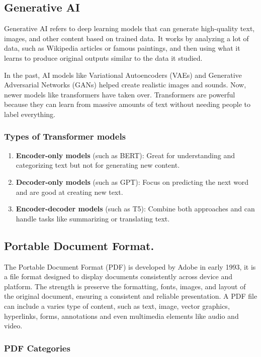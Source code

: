 \documentclass[12pt,oneside,openright,a4paper]{cpe-english-project}
\begin{document}
\newpage


\subsection{Generative AI} Generative AI refers to deep learning models that can generate high-quality text, images, and other content based on trained data.  It works by analyzing a lot of data, such as Wikipedia articles or famous paintings, and then using what it learns to produce original outputs similar to the data it studied. \par
In the past, AI models like Variational Autoencoders (VAEs) and Generative Adversarial Networks (GANs) helped create realistic images and sounds. Now, newer models like transformers have taken over. Transformers are powerful because they can learn from massive amounts of text without needing people to label everything.

\subsubsection{Types of Transformer models}
\begin{enumerate}
	\item \textbf{Encoder-only models} (such as BERT): Great for understanding and categorizing text but not for generating new content.
	\item \textbf{Decoder-only models} (such as GPT): Focus on predicting the next word and are good at creating new text.
	\item \textbf{Encoder-decoder models} (such as T5): Combine both approaches and can handle tasks like summarizing or translating text.
\end{enumerate}


\subsection{Portable Document Format.}

The Portable Document Format (PDF) is developed by Adobe in early 1993, it is a file format designed to display documents consistently across device and platform. The strength is preserve the formatting, fonts, images, and layout of the original document, ensuring a consistent and reliable presentation. A PDF file can include a varies type of content, such as text, image, vector graphics, hyperlinks, forms, annotations and even multimedia elements like audio and video.

\subsubsection {PDF Categories}
\end{document}
